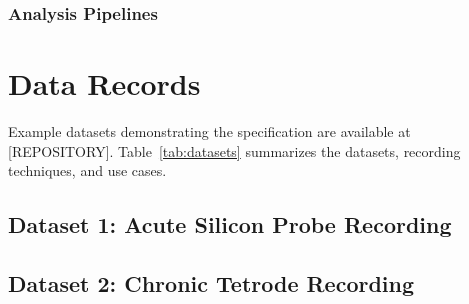 \documentclass[fleqn,10pt]{wlscirep}
\begin{document}
\subsubsection*{Analysis Pipelines}


\section*{Data Records}




Example datasets demonstrating the specification are available at [REPOSITORY].
Table~\ref{tab:datasets} summarizes the datasets, recording techniques, and use cases.


\subsection*{Dataset 1: Acute Silicon Probe Recording}

\subsection*{Dataset 2: Chronic Tetrode Recording}
\end{document}
